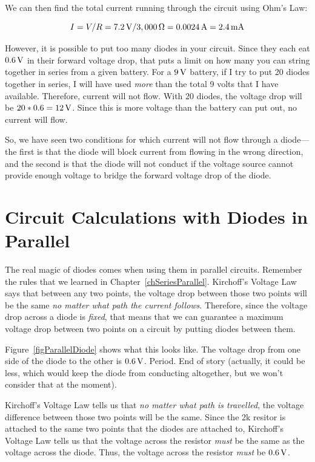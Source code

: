We can then find the total current running through the circuit using Ohm's Law:

$$ I = V / R = 7.2\,\si{\volt} / 3,000\,\si{\ohm} = 0.0024\,\si{\ampere} = 2.4\,\si{\milli\ampere}$$


However, it is possible to put too many diodes in your circuit.
Since they each eat $0.6\,\si{\volt}$ in their forward voltage drop, that puts a limit on how many you can string together in series from a given battery.
For a $9\,\si{\volt}$ battery, if I try to put 20 diodes together in series, I will have used \emph{more} than the total 9 volts that I have available.  
Therefore, current will not flow.
With 20 diodes, the voltage drop will be $20 * 0.6 = 12\,\si{\volt}$.  
Since this is more voltage than the battery can put out, no current will flow.

So, we have seen two conditions for which current will not flow through a diode---the first is that the diode will block current from flowing in the wrong direction, and the second is that the diode will not conduct if the voltage source cannot provide enough voltage to bridge the forward voltage drop of the diode.

\section{Circuit Calculations with Diodes in Parallel}

The real magic of diodes comes when using them in parallel circuits.
Remember the rules that we learned in Chapter~\ref{chSeriesParallel}.
Kirchoff's Voltage Law says that between any two points, the voltage drop between those two points will be the same \emph{no matter what path the current follows}.
Therefore, since the voltage drop across a diode is \emph{fixed}, that means that we can guarantee a maximum voltage drop between two points on a circuit by putting diodes between them.


Figure~\ref{figParallelDiode} shows what this looks like.  
The voltage drop from one side of the diode to the other is $0.6\,\si{\volt}$.
Period. End of story (actually, it could be less, which would keep the diode from conducting altogether, but we won't consider that at the moment).

Kirchoff's Voltage Law tells us that \emph{no matter what path is travelled}, the voltage difference between those two points will be the same.
Since the 2k resitor is attached to the same two points that the diodes are attached to, Kirchoff's Voltage Law tells us that the voltage across the resistor \emph{must} be the same as the voltage across the diode.
Thus, the voltage across the resistor \emph{must} be $0.6\,\si{\volt}$.

